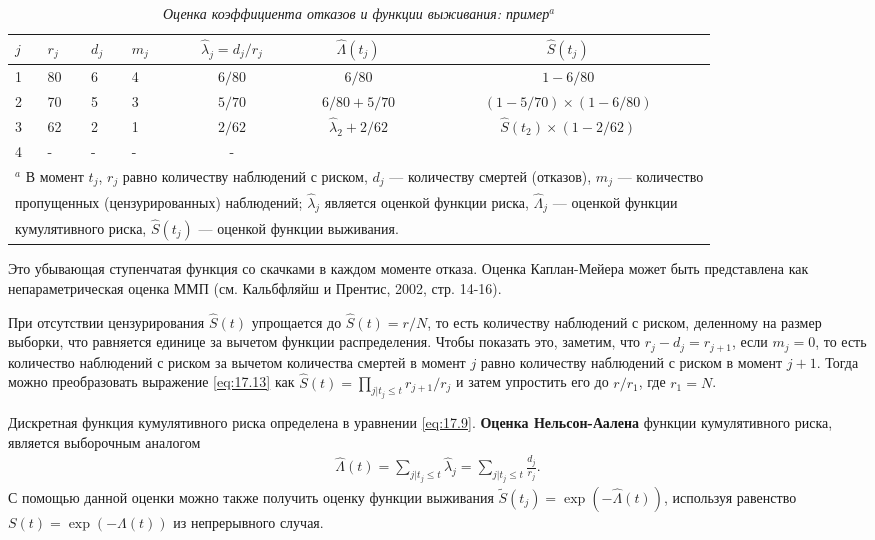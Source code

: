     \begin{table}[!htbp]\caption{\textit{Оценка коэффициента отказов и функции выживания: пример}${}^a$}\label{tab:17.2}
    \begin{tabularx}{\textwidth}{X X X X c c c}
    \hline \hline
$j$ &$r_j$  &$d_j$  &$m_j$  &$\hat{\lambda}_j=d_j/r_j$ &$\hat{\Lambda}(t_j)$   &$\hat{S}(t_j)$\\
    \hline
1   &80     &6      &4      &$6/80$                    &$6/80$                  &$1-6/80$\\
2   &70     &5      &3      &$5/70$                    &$6/80+5/70$             &$(1-5/70)\times(1-6/80)$\\
3   &62     &2      &1      &$2/62$                    &$\hat{\lambda}_2+2/62$  &$\hat{S}(t_2)\times(1-2/62)$\\
4   &-      &-      &-      &-                                  &               &\\
    \hline \hline
\multicolumn{7}{l}{${}^a$ \scriptsize{В момент $t_j$, $r_j$ равно количеству наблюдений с риском, $d_j$ --- количеству смертей (отказов), $m_j$ --- количество}}\\[-0.15cm]
\multicolumn{7}{l}{\hspace{0.3cm}\scriptsize{пропущенных (цензурированных) наблюдений; $\hat{\lambda}_j$ является оценкой функции риска, $\hat{\Lambda}_j$ --- оценкой функции}}\\[-0.15cm]
\multicolumn{7}{l}{\hspace{0.3cm}\scriptsize{кумулятивного риска, $\hat{S}(t_j)$ --- оценкой функции выживания.}}
    \end{tabularx}
    \end{table}
Это убывающая ступенчатая функция со скачками в каждом моменте отказа. Оценка Каплан-Мейера может быть представлена как непараметрическая оценка ММП (см. Кальбфляйш и Прентис, 2002, стр. 14-16).

При отсутствии цензурирования $\hat{S}(t)$ упрощается до $\hat{S}(t)=r/N$, то есть количеству наблюдений с риском, деленному на размер выборки, что равняется единице за вычетом функции распределения. Чтобы показать это, заметим, что $r_j-d_j=r_{j+1}$, если $m_j=0$, то есть количество наблюдений с риском за вычетом количества смертей в момент $j$ равно количеству наблюдений с риском в момент $j+1$. Тогда можно преобразовать выражение \ref{eq:17.13} как $\hat{S}(t)=\prod_{j|t_j\le t} r_{j+1}/r_j$ и затем упростить его до $r/r_1$, где $r_1=N$.

Дискретная функция кумулятивного риска определена в уравнении \ref{eq:17.9}. \textbf{Оценка Нельсон-Аалена} функции кумулятивного риска, является выборочным аналогом
        \begin{align}
        \label{eq:17.14}
        \hat{\Lambda}(t)=\sum_{j|t_j\le t} \hat{\lambda}_j=\sum_{j|t_j\le t} \frac{d_j}{r_j}.
        \end{align}
С помощью данной оценки можно также получить оценку функции выживания $\tilde{S}(t_j)=\exp{(-\hat{\Lambda}(t))}$, используя равенство $S(t)=\exp{(-\Lambda(t))}$ из непрерывного случая.

